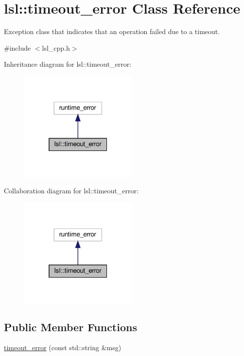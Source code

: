 \hypertarget{classlsl_1_1timeout__error}{}\section{lsl\+:\+:timeout\+\_\+error Class Reference}
\label{classlsl_1_1timeout__error}


Exception class that indicates that an operation failed due to a timeout.  




{\ttfamily \#include $<$lsl\+\_\+cpp.\+h$>$}



Inheritance diagram for lsl\+:\+:timeout\+\_\+error\+:
\nopagebreak
\begin{figure}[H]
\begin{center}
\leavevmode
\includegraphics[width=169pt]{d9/d05/classlsl_1_1timeout__error__inherit__graph}
\end{center}
\end{figure}


Collaboration diagram for lsl\+:\+:timeout\+\_\+error\+:
\nopagebreak
\begin{figure}[H]
\begin{center}
\leavevmode
\includegraphics[width=169pt]{d4/d2c/classlsl_1_1timeout__error__coll__graph}
\end{center}
\end{figure}
\subsection*{Public Member Functions}
\begin{DoxyCompactItemize}
\item 
\hyperlink{classlsl_1_1timeout__error_afbc3b7c957fe3da4021aff3c30e6192f}{timeout\+\_\+error} (const std\+::string \&msg)
\end{DoxyCompactItemize}


